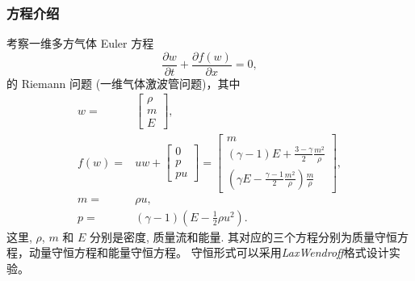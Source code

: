 \documentclass[10.5pt
]{article}
\begin{document}
\subsubsection{方程介绍}
考察一维多方气体 Euler 方程
\begin{equation}
\frac{\partial w}{\partial t} + \frac{\partial f(w)}{\partial
x}= 0\label{Eqn:Euler},
\end{equation}
的 Riemann 问题 (一维气体激波管问题)，其中
\begin{align}
w =& \left[\begin{array}{c}
\rho\\
m\\
E
\end{array}\right],
\\
f(w) =& u w + \left[\begin{array}{c}
0\\
p\\
p u
\end{array}\right] = \left[\begin{array}{c}
m
\\
(\gamma - 1) E + \frac{3 - \gamma}{2} \frac{m^2}{\rho}
\\
(\gamma E - \frac{\gamma - 1}{2} \frac{m^2}{\rho}) \frac{m}{\rho}
\end{array}\right],
\\
m =& \rho u,
\\
p =& (\gamma - 1)(E - \frac{1}{2} \rho u^2).
\end{align}
这里, $\rho$, $m$ 和 $E$ 分别是密度, 质量流和能量. 
其对应的三个方程分别为质量守恒方程，动量守恒方程和能量守恒方程。
守恒形式可以采用\textit{LaxWendroff}格式设计实验。
\end{document}
